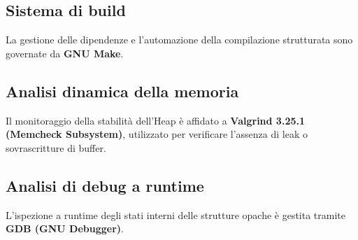 \documentclass[12pt, a4paper]{article}
\begin{document}
\subsection{Sistema di build}
La gestione delle dipendenze e l'automazione della compilazione strutturata sono governate da \textbf{GNU Make}.

\subsection{Analisi dinamica della memoria}
Il monitoraggio della stabilità dell'Heap è affidato a \textbf{Valgrind 3.25.1 (Memcheck Subsystem)}, utilizzato per verificare l'assenza di leak o sovrascritture di buffer.

\subsection{Analisi di debug a runtime}
L'ispezione a runtime degli stati interni delle strutture opache è gestita tramite \textbf{GDB (GNU Debugger)}.
\end{document}
